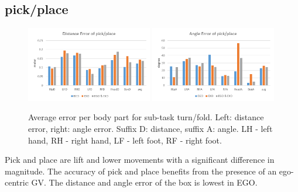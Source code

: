 \subsection{pick/place}
\begin{figure}[H]
	\centering
	\includegraphics[width=0.49\textwidth]{figures/distanceErrorPickPlace.png}
	\includegraphics[width=0.49\textwidth]{figures/angleErrorPickPlace.png}
	\caption[Average error per body part for sub-task turn/fold.]{Average error per body part for sub-task turn/fold. Left: distance error, right: angle error. Suffix D: distance, suffix A: angle. LH - left hand, RH - right hand, LF - left foot, RF - right foot.}
	\label{fig:errorPickPlace}
\end{figure}
Pick and place are lift and lower movements with a significant difference in magnitude. The accuracy of pick and place benefits from the presence of an ego-centric GV. The distance and angle error of the box is lowest in EGO.

